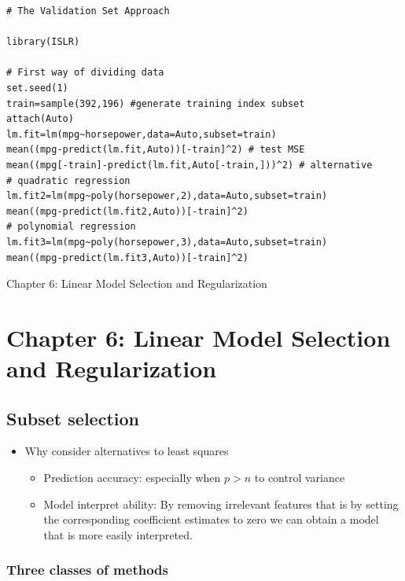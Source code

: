 \documentclass{article}
\begin{document}
\begin{lstlisting}
# The Validation Set Approach

library(ISLR)

# First way of dividing data
set.seed(1)
train=sample(392,196) #generate training index subset
attach(Auto)
lm.fit=lm(mpg~horsepower,data=Auto,subset=train)
mean((mpg-predict(lm.fit,Auto))[-train]^2) # test MSE 
mean((mpg[-train]-predict(lm.fit,Auto[-train,]))^2) # alternative
# quadratic regression
lm.fit2=lm(mpg~poly(horsepower,2),data=Auto,subset=train)
mean((mpg-predict(lm.fit2,Auto))[-train]^2)
# polynomial regression
lm.fit3=lm(mpg~poly(horsepower,3),data=Auto,subset=train)
mean((mpg-predict(lm.fit3,Auto))[-train]^2)

\end{lstlisting}

\pagebreak

\begin{center}
    \Large{Chapter 6: Linear Model Selection and Regularization}
\end{center}

\section{Chapter 6: Linear Model Selection and Regularization}

\subsection{Subset selection}

\begin{itemize}
    \item Why consider alternatives to least squares
    \begin{itemize}
        \item Prediction accuracy: especially when $p > n$ to control variance
        \item Model interpret ability: By removing irrelevant features that is by setting the corresponding coefficient estimates to zero we can obtain a model that is more easily interpreted.
    \end{itemize}
\end{itemize}
\subsubsection{Three classes of methods}
\end{document}
